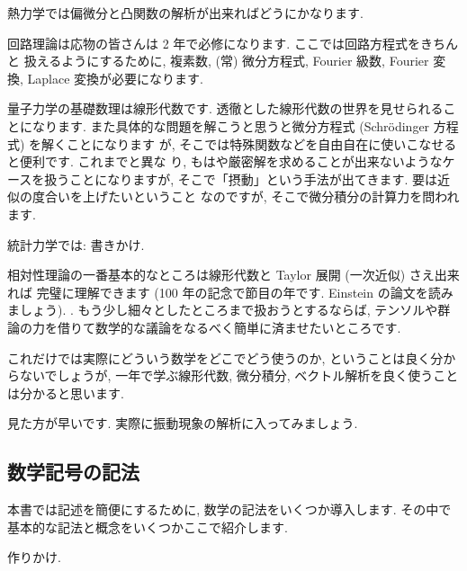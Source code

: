 \documentclass[openany, a4paper, oneside]{jsbook}
\begin{document}
熱力学では偏微分と凸関数の解析が出来ればどうにかなります.

回路理論は応物の皆さんは 2 年で必修になります. ここでは回路方程式をきちんと
扱えるようにするために, 複素数, (常) 微分方程式, Fourier 級数, Fourier 変
換, Laplace 変換が必要になります.

量子力学の基礎数理は線形代数です. 透徹とした線形代数の世界を見せられることになります.
また具体的な問題を解こうと思うと微分方程式 (Schr\"odinger 方程式) を解くことになります
が, そこでは特殊関数などを自由自在に使いこなせると便利です. これまでと異な
り, もはや厳密解を求めることが出来ないようなケースを扱うことになりますが,
そこで「摂動」という手法が出てきます. 要は近似の度合いを上げたいということ
なのですが, そこで微分積分の計算力を問われます.

統計力学では: 書きかけ.

相対性理論の一番基本的なところは線形代数と Taylor 展開 (一次近似) さえ出来れば
完璧に理解できます (100 年の記念で節目の年です. Einstein の論文を読みましょう). .
もう少し細々としたところまで扱おうとするならば,
テンソルや群論の力を借りて数学的な議論をなるべく簡単に済ませたいところです.

これだけでは実際にどういう数学をどこでどう使うのか,
ということは良く分からないでしょうが, 一年で学ぶ線形代数, 微分積分, ベクトル解析を良く使うことは分かると思います.

見た方が早いです.
実際に振動現象の解析に入ってみましょう.
\subsection{数学記号の記法}

本書では記述を簡便にするために, 数学の記法をいくつか導入します.
その中で基本的な記法と概念をいくつかここで紹介します.

作りかけ.
\end{document}
